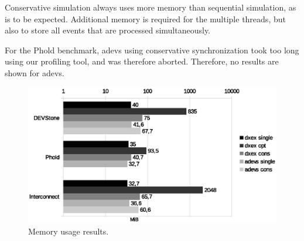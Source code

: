 Conservative simulation always uses more memory than sequential simulation, as is to be expected.
Additional memory is required for the multiple threads, but also to store all events that are processed simultaneously.

For the Phold benchmark, adevs using conservative synchronization took too long using our profiling tool, and was therefore aborted.
Therefore, no results are shown for adevs.

\begin{figure}
    \includegraphics[width=\columnwidth]{fig/memory_voorlopig.eps}
    \caption{Memory usage results.}
    \label{fig:memory}
\end{figure}
